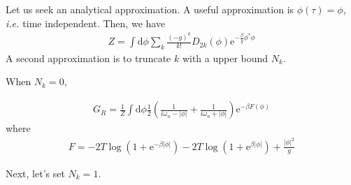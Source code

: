 \documentclass[11pt]{article}
\newcommand{\bea}{\begin{eqnarray}}
\newcommand{\eea}{\end{eqnarray}}
\newcommand{\md}{\mathrm{d}}
\newcommand{\ie}{\textit{i.e.{ }}}
\newcommand{\me}{\mathrm{e}}
\begin{document}
Let us seek an analytical approximation. A useful approximation is $\phi(\tau)=\phi$, \ie time independent. Then, we have
\bea Z=\int \md \phi \sum_k \frac{(-g)^k}{k!} D_{2k}(\phi) \me^{-\frac{\beta}{g}\phi^*\phi} \eea 
A second approximation is to truncate $k$ with a upper bound $N_k$. 

When $N_k=0$,

\bea G_R=\frac{1}{Z}\int\md \phi \frac{1}{2}\left(\frac{1}{i\omega_n-|\phi|}+\frac{1}{i\omega_n+|\phi|}\right)\me^{-\beta F(\phi)} \eea
where
\bea F=-2T\log(1+\me^{-\beta|\phi|})-2T\log(1+\me^{\beta|\phi|})+\frac{|\phi|^2}{g} \eea 

Next, let's set $N_k=1$.


\end{document}
